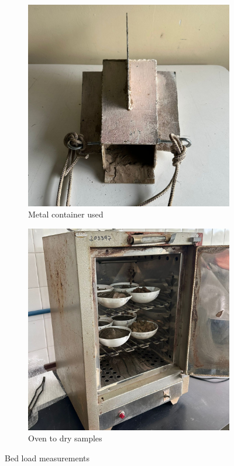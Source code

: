\begin{figure}[H]
    \begin{subfigure}{0.48\textwidth}
        \centering
        \includegraphics[width=\linewidth]{figures/appendixE/metalcontainer.jpg}
        \caption{Metal container used}
    \end{subfigure}\hfill
    \begin{subfigure}{0.48\textwidth}
        \centering
        \includegraphics[width=\linewidth]{figures/appendixE/oven.jpg}
        \caption{Oven to dry samples}
    \end{subfigure}

    \caption{Bed load measurements}
    \label{fig:bed-load}
\end{figure}

